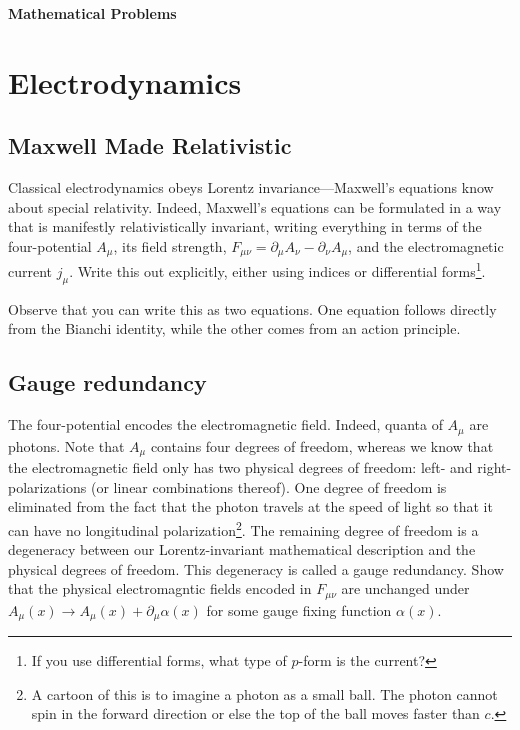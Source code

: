 \documentclass[12pt]{article}
\numberwithin{equation}{section}    %
\begin{document}
\vspace{2em}
{\Large\textbf{\textsf{Mathematical Problems}}}

\section{Electrodynamics}

\subsection{Maxwell Made Relativistic}

Classical electrodynamics obeys Lorentz invariance---Maxwell's equations know about special relativity. Indeed, Maxwell's equations can be formulated in a way that is manifestly relativistically invariant, writing everything in terms of the four-potential $A_\mu$, its field strength, $F_{\mu\nu} = \partial_\mu A_\nu - \partial_\nu A_\mu$, and the electromagnetic current $j_\mu$. Write this out explicitly, either using indices or differential forms\footnote{If you use differential forms, what type of $p$-form is the current?}. 

Observe that you can write this as two equations. One equation follows directly from the Bianchi identity, while the other comes from an action principle.

\subsection{Gauge redundancy}

The four-potential encodes the electromagnetic field. Indeed, quanta of $A_\mu$ are photons. Note that $A_\mu$ contains four degrees of freedom, whereas we know that the electromagnetic field only has two physical degrees of freedom: left- and right-polarizations (or linear combinations thereof). One degree of freedom is eliminated from the fact that the photon travels at the speed of light so that it can have no longitudinal polarization\footnote{A cartoon of this is to imagine a photon as a small ball. The photon cannot spin in the forward direction or else the top of the ball moves faster than $c$.}. The remaining degree of freedom is a degeneracy between our Lorentz-invariant mathematical description and the physical degrees of freedom. This degeneracy is called a gauge redundancy. Show that the physical electromagntic fields encoded in $F_{\mu\nu}$ are unchanged under $A_\mu(x) \to A_\mu(x) + \partial_\mu \alpha(x)$ for some gauge fixing function $\alpha(x)$. 
\end{document}
